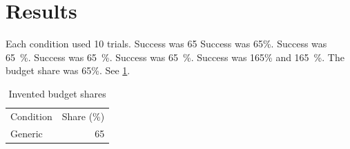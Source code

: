 \section{Results}
Each condition used 10 trials.
Success was 65%
Success was 65\%.
Success was \SI{65}{\percent}.
Success was \qty{65}{\percent}.
Success was \SI{65}{\%}.
Success was 165\% and \SI{165}{\percent}.
The budget share was 65\%.
See \ref{tab:shares}.
\begin{table}\caption{Invented budget shares}\label{tab:shares}
\begin{tabular}{lr}Condition & Share (\%) \\ Generic & 65 \\ \end{tabular}
\end{table}
\nocite{*}

